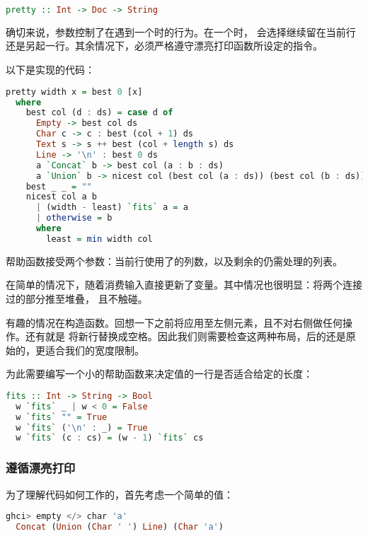\documentclass[./main.tex]{subfiles}
\begin{document}
\begin{lstlisting}[language=Haskell]
  pretty :: Int -> Doc -> String
\end{lstlisting}

确切来说，参数控制了在遇到一个时的行为。在一个时，
会选择继续留在当前行还是另起一行。其余情况下，必须严格遵守漂亮打印函数所设定的指令。

以下是实现的代码：

\begin{lstlisting}[language=Haskell]
  pretty width x = best 0 [x]
  where
    best col (d : ds) = case d of
      Empty -> best col ds
      Char c -> c : best (col + 1) ds
      Text s -> s ++ best (col + length s) ds
      Line -> '\n' : best 0 ds
      a `Concat` b -> best col (a : b : ds)
      a `Union` b -> nicest col (best col (a : ds)) (best col (b : ds))
    best _ _ = ""
    nicest col a b
      | (width - least) `fits` a = a
      | otherwise = b
      where
        least = min width col
\end{lstlisting}

帮助函数接受两个参数：当前行使用了的列数，以及剩余的仍需处理的列表。

在简单的情况下，随着消费输入直接更新了变量。其中情况也很明显：将两个连接过的部分推至堆叠，
且不触碰。

有趣的情况在构造函数。回想一下之前将应用至左侧元素，且不对右侧做任何操作。还有就是
将新行替换成空格。因此我们则需要检查这两种布局，后的还是原始的，更适合我们的宽度限制。

为此需要编写一个小的帮助函数来决定值的一行是否适合给定的长度：

\begin{lstlisting}[language=Haskell]
  fits :: Int -> String -> Bool
  w `fits` _ | w < 0 = False
  w `fits` "" = True
  w `fits` ('\n' : _) = True
  w `fits` (c : cs) = (w - 1) `fits` cs
\end{lstlisting}

\subsubsection*{遵循漂亮打印}

为了理解代码如何工作的，首先考虑一个简单的值：

\begin{lstlisting}[language=Haskell]
  ghci> empty </> char 'a'
  Concat (Union (Char ' ') Line) (Char 'a')
\end{lstlisting}
\end{document}
